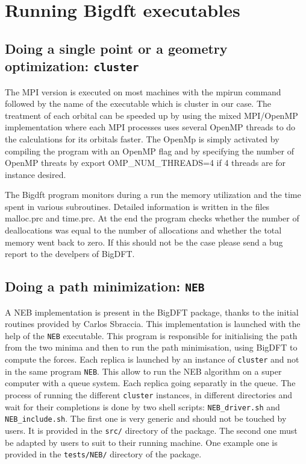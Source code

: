 \documentclass[a4paper,11pt]{report}
\begin{document}
\chapter{ Running Bigdft executables}

\section{Doing a single point or a geometry optimization: \texttt{cluster}}
The MPI version is executed on most machines with the mpirun command followed by the name of the executable which is 
cluster in our case.
The treatment of each orbital can be speeded up by using the mixed MPI/OpenMP implementation 
where each MPI processes uses several OpenMP threads to do the calculations for its orbitals faster. 
The OpenMp is simply activated by compiling the program with an OpenMP flag and by specifying the number of OpenMP threats by
export OMP\_NUM\_THREADS=4 if 4 threads are for instance desired.

\noindent
The Bigdft program monitors during a run the memory utilization and the time spent in various subroutines. Detailed information 
is written in the files malloc.prc and time.prc. At the end the program checks whether the number of deallocations was equal 
to the number of allocations and whether the total memory went back to zero. If this should not be the case please send a bug report to the develpers of BigDFT.

\section{Doing a path minimization: \texttt{NEB}}
A NEB implementation is present in the BigDFT package, thanks to the initial routines provided by Carlos Sbraccia. This implementation is launched with the help of the \texttt{NEB} executable. This program is responsible for initialising the path from the two minima and then to run the path minimisation, using BigDFT to compute the forces. Each replica is launched by an instance of \texttt{cluster} and not in the same program \texttt{NEB}. This allow to run the NEB algorithm on a super computer with a queue system. Each replica going separatly in the queue. The process of running the different \texttt{cluster} instances, in different directories and wait for their completions is done by two shell scripts: \texttt{NEB\_driver.sh} and \texttt{NEB\_include.sh}. The first one is very generic and should not be touched by users. It is provided in the \texttt{src/} directory of the package. The second one must be adapted by users to suit to their running machine. One example one is provided in the \texttt{tests/NEB/} directory of the package.
\end{document}
